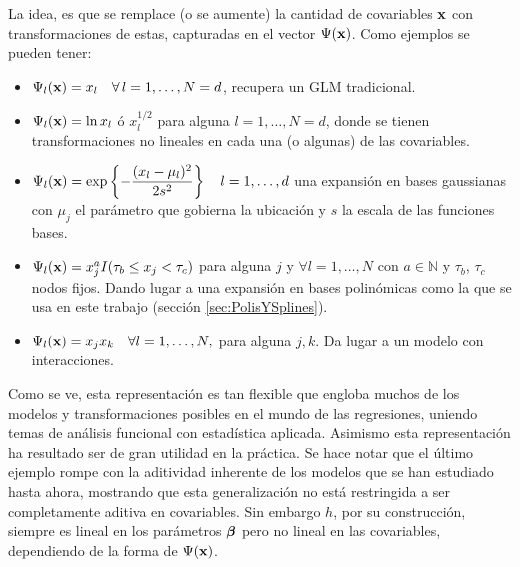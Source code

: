 \documentclass[../Main/Main.tex]{subfiles}
\begin{document}
La idea, es que se remplace (o se aumente) la cantidad de covariables $\mathbf{x}$ con transformaciones de estas, capturadas en el vector $\Psi(\mathbf{x})$. Como ejemplos se pueden tener:
\begin{itemize}[label = {}]
	\item $\Psi_l(\mathbf{x}) = x_l \quad \forall\,l = 1,\ldots, N = d$,  recupera un GLM tradicional.
	\item $\Psi_l(\mathbf{x}) = \ln x_l$ ó $x^{1/2}_l$ para alguna $l = 1,\ldots, N = d$, donde se tienen transformaciones no lineales en cada una (o algunas) de las covariables.
	\item $\Psi_l(\mathbf{x}) = \exp\left\{-\dfrac{(x_l - \mu_l)^2}{2s^2}\right\} \quad l = 1,\ldots,d$ una expansión en bases gaussianas con $\mu_j$ el parámetro que gobierna la ubicación y $s$ la escala de las funciones bases.
	\item $\Psi_l(\mathbf{x}) = x_j^aI( \tau_b \leq x_j <  \tau_c)$ para alguna $j$ y $\forall l =1,\ldots,N$ con $a\in \mathbb{N}$ y $\tau_b$, $\tau_c$ nodos fijos. Dando lugar a  una expansión en bases polinómicas como la que se usa en este trabajo (sección \ref{sec:PolisYSplines}).
	\item $\Psi_l(\mathbf{x}) = x_jx_k  \quad \forall l = 1,\ldots,N,$  para alguna $j,k$. Da lugar a un modelo con interacciones. 
\end{itemize}

Como se ve, esta representación es tan flexible que engloba muchos de los modelos y transformaciones posibles en el mundo de las regresiones, uniendo temas de análisis funcional con estadística aplicada. Asimismo esta representación ha resultado ser de gran utilidad en la práctica. Se hace notar que el último ejemplo rompe con la aditividad inherente de los modelos que se han estudiado hasta ahora, mostrando que esta generalización no está restringida a ser completamente aditiva en covariables. Sin embargo $h$, por su construcción, siempre es lineal en los parámetros $\bm{\beta}$ pero no lineal en las covariables, dependiendo de la forma de $\Psi(\mathbf{x})$.
\end{document}
